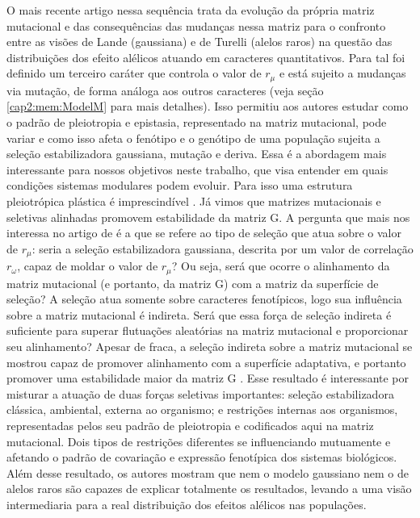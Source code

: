O mais recente artigo nessa sequência \citep{Jones2007} trata da
evolução da própria matriz mutacional e das consequências das mudanças
nessa matriz para o confronto entre as visões de Lande (gaussiana) e de
Turelli (alelos raros) na questão das distribuições dos efeito alélicos
atuando em caracteres quantitativos.
Para tal foi definido um terceiro caráter que controla o valor de
$r_\mu$ e está sujeito a mudanças via mutação, de forma análoga aos
outros caracteres (veja seção \ref{cap2:mem:ModelM} para mais detalhes).
Isso permitiu aos autores estudar como o padrão de pleiotropia e
epistasia, representado na matriz mutacional, pode variar e como isso
afeta o fenótipo e o genótipo de uma população sujeita a seleção
estabilizadora gaussiana, mutação e deriva.
Essa é a abordagem mais interessante para nossos objetivos neste
trabalho, que visa entender em quais condições sistemas modulares podem
evoluir.
Para isso uma estrutura pleiotrópica plástica é imprescindível
\citep{Wagner1996, Pavlicev2011a}.
Já vimos que matrizes mutacionais e seletivas alinhadas promovem
estabilidade da matriz G.
A pergunta que mais nos interessa no artigo de \cite{Jones2007} é a que
se refere ao tipo de seleção que atua sobre o valor de $r_\mu$: seria a
seleção estabilizadora gaussiana, descrita por um valor de correlação
$r_\omega$, capaz de moldar o valor de $r_\mu$? 
Ou seja, será que ocorre o alinhamento da matriz mutacional (e portanto,
da matriz G)  com a matriz da superfície de seleção? 
A seleção atua somente sobre caracteres fenotípicos, logo sua influência
sobre a matriz mutacional é indireta.
Será que essa força de seleção indireta é suficiente para superar
flutuações aleatórias na matriz mutacional e proporcionar seu
alinhamento? Apesar de fraca, a seleção indireta sobre a matriz
mutacional se mostrou capaz de promover alinhamento com a superfície
adaptativa, e portanto promover uma estabilidade maior da matriz G
\citep{Jones2007}.
Esse resultado é interessante por misturar a atuação de duas forças
seletivas importantes: seleção estabilizadora clássica, ambiental,
externa ao organismo; e restrições internas aos organismos,
representadas pelos seu padrão de pleiotropia e codificados aqui na
matriz mutacional.
Dois tipos de restrições diferentes se influenciando mutuamente e
afetando o padrão de covariação e expressão fenotípica dos sistemas
biológicos.
Além desse resultado, os autores mostram que nem o modelo gaussiano nem
o de alelos raros são capazes de explicar totalmente os resultados,
levando a uma visão intermediaria para a real distribuição dos efeitos
alélicos nas populações.

